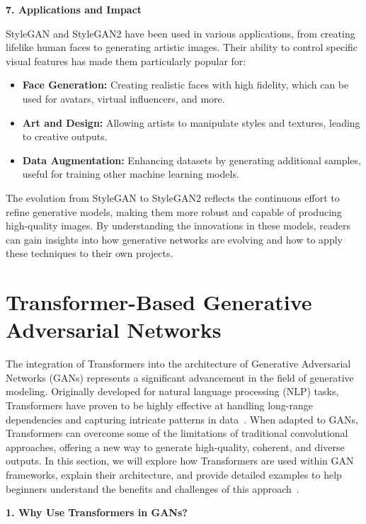 \textbf{7. Applications and Impact}

StyleGAN and StyleGAN2 have been used in various applications, from creating lifelike human faces to generating artistic images. Their ability to control specific visual features has made them particularly popular for:
\begin{itemize}
    \item \textbf{Face Generation:} Creating realistic faces with high fidelity, which can be used for avatars, virtual influencers, and more.
    \item \textbf{Art and Design:} Allowing artists to manipulate styles and textures, leading to creative outputs.
    \item \textbf{Data Augmentation:} Enhancing datasets by generating additional samples, useful for training other machine learning models.
\end{itemize}

The evolution from StyleGAN to StyleGAN2 reflects the continuous effort to refine generative models, making them more robust and capable of producing high-quality images. By understanding the innovations in these models, readers can gain insights into how generative networks are evolving and how to apply these techniques to their own projects.


\section{Transformer-Based Generative Adversarial Networks}

The integration of Transformers into the architecture of Generative Adversarial Networks (GANs) represents a significant advancement in the field of generative modeling. Originally developed for natural language processing (NLP) tasks, Transformers have proven to be highly effective at handling long-range dependencies and capturing intricate patterns in data~\cite{zhang2019self}. When adapted to GANs, Transformers can overcome some of the limitations of traditional convolutional approaches, offering a new way to generate high-quality, coherent, and diverse outputs. In this section, we will explore how Transformers are used within GAN frameworks, explain their architecture, and provide detailed examples to help beginners understand the benefits and challenges of this approach~\cite{wang2020attentive}.

\textbf{1. Why Use Transformers in GANs?}

